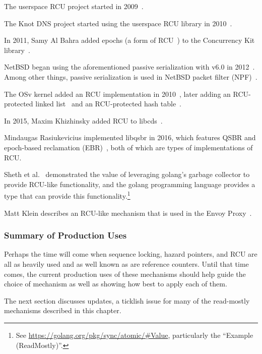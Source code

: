 The userspace RCU project started in 2009~\cite{MathieuDesnoyers2009URCU}.

The Knot DNS project started using the userspace RCU
library in 2010~\cite{LubosSlovak2010KnotDNSRCU}.

In 2011, Samy Al Bahra added epochs
(a form of RCU~\cite{KeirAnthonyFraserPhD,KeirFraser2007withoutLocks})
to the Concurrency Kit
library~\cite{SamyAlBahra2011ckEpoch}.

NetBSD began using the aforementioned passive serialization with v6.0 in
2012~\cite{NetBSD2012pserialize}.
Among other things, passive serialization is used in
NetBSD packet filter (NPF)~\cite{MindaugasRasiukevicius2014NPFRCU}.

The OSv kernel added an RCU implementation in 2010~\cite{AviKivity2013OSvRCU},
later adding an RCU-protected linked list~\cite{AviKivity2013OSvRCUlist}
and an RCU-protected hash table~\cite{AviKivity2013OSvRCUhash}.

In 2015, Maxim Khizhinsky added RCU to
libcds~\cite{MaxKhiszinsky2015C++RCU}.

Mindaugas Rasiukevicius implemented libqsbr in 2016, which features
QSBR and epoch-based reclamation
(EBR)~\cite{MindaugasRasiukevicius2016libqsbr},
both of which are types of implementations of RCU.

Sheth et al.~\cite{HarshalSheth2016goRCU}
demonstrated the value of leveraging golang's garbage
collector to provide RCU-like functionality, and
the golang programming language provides a  type that can
provide this functionality.\footnote{
	See \url{https://golang.org/pkg/sync/atomic/\#Value}, particularly
	the ``Example (ReadMostly)''.}

Matt Klein describes an RCU-like mechanism that is used in the Envoy
Proxy~\cite{MattKlein2017EnvoyRCU}.

\subsubsection{Summary of Production Uses}
\label{sec:defer:Summary of Production Uses}

Perhaps the time will come when sequence locking, hazard pointers, and
RCU are all as heavily used and as well known as are reference counters.
Until that time comes, the current production uses of these mechanisms
should help guide the choice of mechanism as well as showing how best
to apply each of them.

The next section discusses updates, a ticklish issue for many of the
read-mostly mechanisms described in this chapter.
